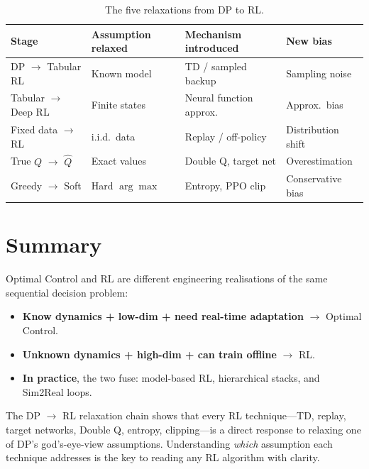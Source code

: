 \begin{table}[htbp]
\centering
\caption{The five relaxations from DP to RL.}
\begin{tabular}{@{}llll@{}}
\toprule
\textbf{Stage} & \textbf{Assumption relaxed} & \textbf{Mechanism introduced} & \textbf{New bias} \\
\midrule
DP $\to$ Tabular RL & Known model & TD / sampled backup & Sampling noise \\
Tabular $\to$ Deep RL & Finite states & Neural function approx. & Approx.\ bias \\
Fixed data $\to$ RL & i.i.d.\ data & Replay / off-policy & Distribution shift \\
True $Q$ $\to$ $\hat{Q}$ & Exact values & Double Q, target net & Overestimation \\
Greedy $\to$ Soft & Hard $\arg\max$ & Entropy, PPO clip & Conservative bias \\
\bottomrule
\end{tabular}
\end{table}

\section{Summary}

Optimal Control and RL are different engineering realisations of the same sequential decision problem:

\begin{itemize}
  \item \textbf{Know dynamics + low-dim + need real-time adaptation} $\to$ Optimal Control.
  \item \textbf{Unknown dynamics + high-dim + can train offline} $\to$ RL.
  \item \textbf{In practice}, the two fuse: model-based RL, hierarchical stacks, and Sim2Real loops.
\end{itemize}

The DP $\to$ RL relaxation chain shows that every RL technique---TD, replay, target networks, Double Q, entropy, clipping---is a direct response to relaxing one of DP's god's-eye-view assumptions.
Understanding \emph{which} assumption each technique addresses is the key to reading any RL algorithm with clarity.
